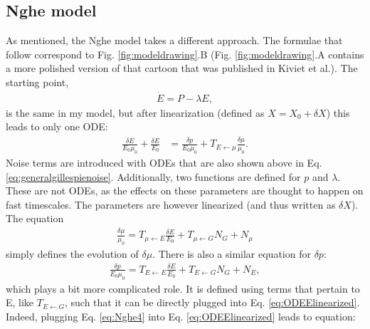 \subsection*{Nghe model}

As mentioned, the Nghe model takes a different approach. 
The formulae that follow correspond to Fig. \ref{fig:modeldrawing}.B (Fig. \ref{fig:modeldrawing}.A contains a more polished version of that cartoon that was published in Kiviet et al.).
The starting point,
%
\begin{align}
\label{eq:Nghe1}
\dot{E} = P - \lambda E
,
\end{align}
%
is the same in my model, but after linearization (defined as $X=X_0+\delta X$) this leads to only one ODE:
%
\begin{align}
\label{eq:ODEElinearized}
\frac{ \delta{\dot{E}} }{E_0 \mu_0} 
+ \frac{\delta E}{E_0} 
& =
\frac{\delta p}{E_0 \mu_0} + T_{E \leftarrow \mu} \frac{\delta \mu}{\mu_0}
.
\end{align}
%
Noise terms are introduced with ODEs that are also shown above in Eq. \ref{eq:generalgillespienoise}.
 Additionally, two functions are defined for $p$ and $\lambda$. These are not ODEs, as the effects on these parameters are thought to happen on fast timescales. The parameters are however linearized (and thus written as $\delta X$). The equation
%
\begin{align}
\label{eq:Nghe3}
\frac{\delta\mu}{\mu_0} = T_{\mu \leftarrow E} \frac{\delta E}{E_0} + T_{\mu \leftarrow G} N_G + N_\mu
\end{align}
%
simply defines the evolution of $\delta \mu$.
There is also a similar equation for $\delta p$:
%
\begin{align}
\label{eq:Nghe4}
\frac{\delta{p}}{E_0 \mu_0} = T_{E \leftarrow E} \frac{\delta E}{E_0} + T_{E \leftarrow G} N_G + N_E
,
\end{align}
%
which plays a bit more complicated role.
It is defined using terms that pertain to E, like $T_{E \leftarrow G}$, such that it can be directly plugged into Eq. \ref{eq:ODEElinearized}. 
Indeed, plugging Eq. \ref{eq:Nghe4} into Eq. \ref{eq:ODEElinearized} leads to equation:
